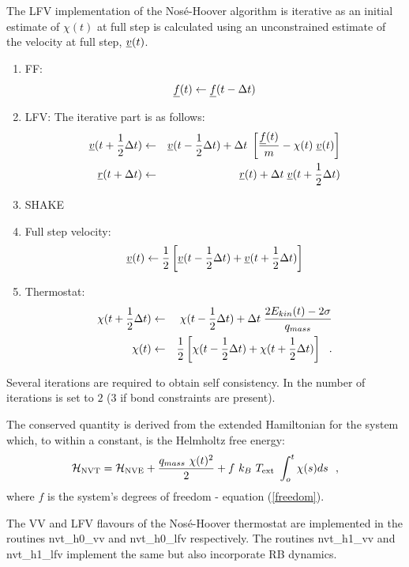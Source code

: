 The LFV implementation of the Nos\'e-Hoover algorithm is iterative as
an initial estimate of $\chi (t)$ at full step is calculated using
an unconstrained estimate of the velocity at full step, $\mbox{$\underline{v}$}(t)$.
\begin{enumerate}
\item FF:
\begin{equation}
\mbox{$\underline{f}$}(t) \leftarrow \mbox{$\underline{f}$}(t - \Delta t)
\end{equation}
\item LFV: The iterative part is as follows:
\begin{eqnarray}
\mbox{$\underline{v}$}(t + {1 \over 2} \Delta t) &\leftarrow& \mbox{$\underline{v}$}(t - {1 \over 2} \Delta t) + \Delta t \;
\left[{\mbox{$\underline{f}$}(t) \over m} - \chi (t) \; \mbox{$\underline{v}$}(t) \right] \nonumber \\
\mbox{$\underline{r}$}(t + \Delta t) &\leftarrow& \mbox{$\underline{r}$}(t) + \Delta t \; \mbox{$\underline{v}$}(t + {1 \over 2} \Delta t)
\end{eqnarray}
\item SHAKE
\item Full step velocity:
\begin{equation}
\mbox{$\underline{v}$}(t) \leftarrow {1 \over 2} \left[ \mbox{$\underline{v}$}(t - {1 \over 2} \Delta t) +
\mbox{$\underline{v}$}(t + {1 \over 2} \Delta t) \right]
\end{equation}
\item Thermostat:
\begin{eqnarray}
\chi (t + {1 \over 2} \Delta t) &\leftarrow& \chi (t - {1 \over 2} \Delta t) +
\Delta t \; {{2 E_{kin}(t) - 2 \sigma} \over q_{mass}} \nonumber \\
\chi (t) &\leftarrow& {1 \over 2} \left[ \chi (t - {1 \over 2} \Delta t) +
\chi (t + {1 \over 2} \Delta t) \right]~~.
\end{eqnarray}
\end{enumerate}
Several iterations are required to obtain self consistency.  In \D
the number of iterations is set to $2$ ($3$ if bond constraints
are present).

The conserved quantity is derived from the extended Hamiltonian for
the system which, to within a constant, is the Helmholtz free
energy:
\begin{equation}
{\cal H}_{\rm NVT} = {\cal H}_{\rm NVE} + {q_{mass}~\chi (t)^{2} \over 2} +
f~k_{B}~T_{\rm ext}~\int_o^t \chi (s) ds~~,
\end{equation}
where $f$ is the system's degrees of freedom - equation
(\ref{freedom}).

The VV and LFV flavours of the Nos\'e-Hoover thermostat are implemented in
the \D routines {\sc nvt\_h0\_vv} and {\sc nvt\_h0\_lfv} respectively.
The routines {\sc nvt\_h1\_vv} and {\sc nvt\_h1\_lfv} implement the
same but also incorporate RB dynamics.

